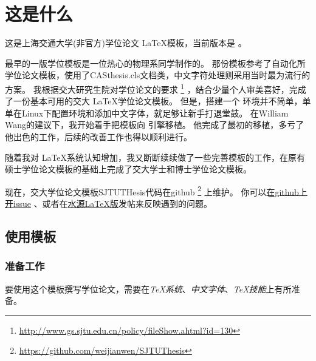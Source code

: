 
\chapter{这是什么}
\label{chap:intro}

这是上海交通大学(非官方)学位论文 \LaTeX 模板，当前版本是 \version 。

最早的一版学位模板是一位热心的物理系同学制作的。
那份模板参考了自动化所学位论文模板，使用了CASthesis.cls文档类，中文字符处理则采用当时最为流行的 \CJKLaTeX 方案。
我根据交大研究生院对学位论文的要求
\footnote{\url{http://www.gs.sjtu.edu.cn/policy/fileShow.ahtml?id=130}}
，结合少量个人审美喜好，完成了一份基本可用的交大 \LaTeX 学位论文模板。
但是，搭建一个 \CJKLaTeX 环境并不简单，单单在Linux下配置环境和添加中文字体，就足够让新手打退堂鼓。
在William Wang的建议下，我开始着手把模板向 \XeTeX 引擎移植。
他完成了最初的移植，多亏了他出色的工作，后续的改善工作也得以顺利进行。

随着我对 \LaTeX 系统认知增加，我又断断续续做了一些完善模板的工作，在原有硕士学位论文模板的基础上完成了交大学士和博士学位论文模板。

现在，交大学位论文模板SJTUTHesis代码在github
\footnote{\url{https://github.com/weijianwen/SJTUThesis}}
上维护。
你可以\href{https://github.com/weijianwen/SJTUThesis/issues}{在github上开issue}
、或者在\href{https://bbs.sjtu.edu.cn/bbsdoc?board=TeX_LaTeX}{水源LaTeX版}发帖来反映遇到的问题。

\section{使用模板}

\subsection{准备工作}
\label{sec:requirements}

要使用这个模板撰写学位论文，需要在\emph{TeX系统}、\emph{中文字体}、\emph{TeX技能}上有所准备。

